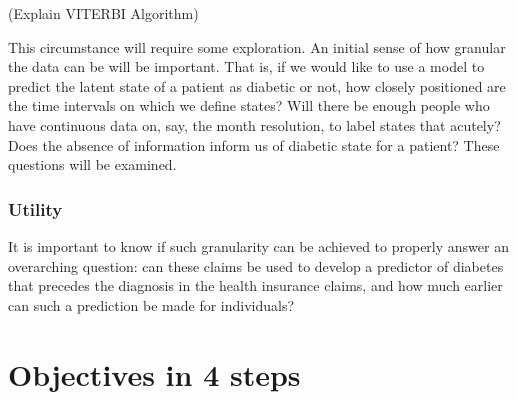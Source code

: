\documentclass{article}
\begin{document}
(Explain VITERBI Algorithm)



This circumstance will require some exploration. An initial sense of how granular the data can be will be important. That is, if we would like to use a model to predict the latent state of a patient as diabetic or not, how closely positioned are the time intervals on which we define states? Will there be enough people who have continuous data on, say, the month resolution, to label states that acutely? Does the absence of information inform us of diabetic state for a patient? These questions will be examined.

\subsubsection{Utility}

It is important to know if such granularity can be achieved to properly answer an overarching question: can these claims be used to develop a predictor of diabetes that precedes the diagnosis in the health insurance claims, and how much earlier can such a prediction be made for individuals?

\section{Objectives in 4 steps}
\end{document}
